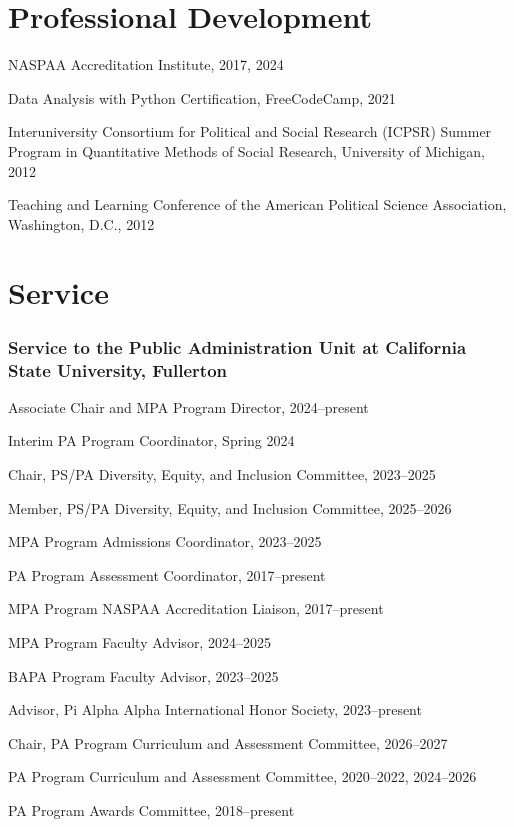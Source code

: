 \documentclass[11pt,letterpaper]{article}
\renewenvironment{itemize}{
  \begin{list}{}{
    \setlength{\leftmargin}{1.5em}
    \setlength{\itemsep}{0.25em}
    \setlength{\parskip}{0pt}
    \setlength{\parsep}{0.25em}
  }
}{
  \end{list}
}
\begin{document}
\section*{Professional Development}
\begin{itemize}\leftmargin=2pt\itemindent=-15pt
  \item NASPAA Accreditation Institute, 2017, 2024
  \item Data Analysis with Python Certification, FreeCodeCamp, 2021
  \item Interuniversity Consortium for Political and Social Research (ICPSR) Summer Program in Quantitative Methods of Social Research, University of Michigan, 2012
  \item Teaching and Learning Conference of the American Political Science Association, Washington, D.C., 2012
\end{itemize}

\section*{Service}

\subsubsection*{Service to the Public Administration Unit at California State University, Fullerton}
\begin{itemize}\leftmargin=2pt\itemindent=-15pt
    \item Associate Chair and MPA Program Director, 2024--present
    \item Interim PA Program Coordinator, Spring 2024
    \item Chair, PS/PA Diversity, Equity, and Inclusion Committee, 2023--2025
    \item Member, PS/PA Diversity, Equity, and Inclusion Committee, 2025--2026
    \item MPA Program Admissions Coordinator, 2023--2025
    \item PA Program Assessment Coordinator, 2017--present
    \item MPA Program NASPAA Accreditation Liaison, 2017--present
    \item MPA Program Faculty Advisor, 2024--2025
    \item BAPA Program Faculty Advisor, 2023--2025
    \item Advisor, Pi Alpha Alpha International Honor Society, 2023--present
    \item Chair, PA Program Curriculum and Assessment Committee, 2026--2027
    \item PA Program Curriculum and Assessment Committee, 2020--2022, 2024--2026
    \item PA Program Awards Committee, 2018--present
\end{itemize}
\end{document}
